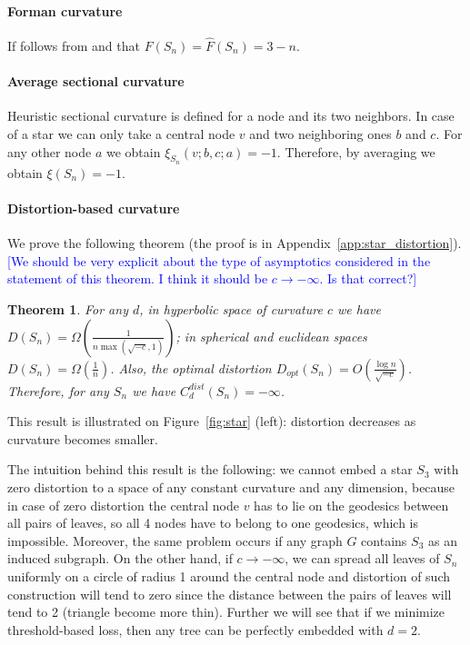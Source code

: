 \documentclass{article} %
\newtheorem{theorem}{Theorem}[section]
\newcommand{\ph}[1]{\textcolor{blue}{#1}}
\begin{document}
\paragraph{Forman curvature}
If follows from  and  that
$F(S_n) = \hat F(S_n) = 3-n$.


\paragraph{Average sectional curvature}

Heuristic sectional curvature is defined for a node and its two neighbors. In case of a star we can only take a central node $v$ and two neighboring ones $b$ and $c$. For any other node $a$ we obtain $\xi_{S_n}(v;b,c;a) = -1$. Therefore, by averaging we obtain $\xi(S_n) = -1$.

\paragraph{Distortion-based curvature} 
We prove the following theorem (the proof is in Appendix~\ref{app:star_distortion}).
\ph{[We should be very explicit about the type of asymptotics considered in the statement of this theorem. I think it should be $c \to -\infty$. Is that correct?]}
\begin{theorem}\label{thm:star_distortion}
For any $d$, in hyperbolic space of curvature $c$ we have $D(S_n) = \Omega\left(\frac{1}{n\max(\sqrt{-c},1)}\right)$; in spherical and euclidean spaces $D(S_n) = \Omega\left(\frac{1}{n}\right)$. Also, the optimal distortion $D_{opt}(S_n) = O\left(\frac{\log n}{\sqrt{-c}}\right)$. Therefore, for any $S_n$ we have $C_d^{dist}(S_n) = -\infty$.
\end{theorem}

This result is illustrated on Figure~\ref{fig:star} (left): distortion decreases as curvature becomes smaller.

The intuition behind this result is the following: we cannot embed a star $S_3$ with zero distortion to a space of any constant curvature and any dimension, because in case of zero distortion the central node $v$ has to lie on the geodesics between all pairs of leaves, so all 4 nodes have to belong to one geodesics, which is impossible. Moreover, the same problem occurs if any graph $G$ contains $S_3$ as an induced subgraph.
On the other hand, if $c \to -\infty$, we can spread all leaves of $S_n$ uniformly on a circle of radius 1 around the central node and distortion of such construction will tend to zero since the distance between the pairs of leaves will tend to 2 (triangle become more thin). 
Further we will see that if we minimize threshold-based loss, then any tree can be perfectly embedded with $d = 2$.
\end{document}
